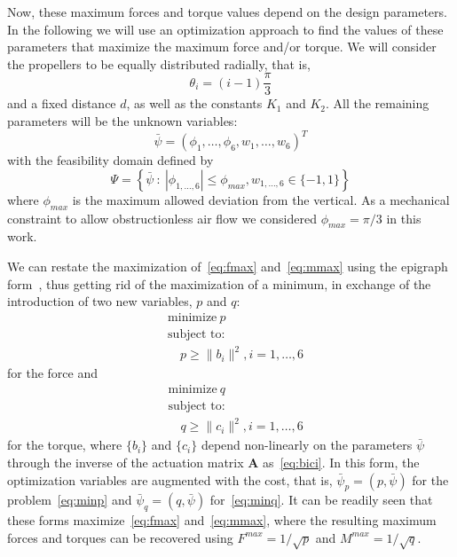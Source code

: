\documentclass[review]{elsarticle}
\begin{document}
Now, these maximum forces and torque values depend on the design
parameters. In the following we will use an optimization approach to
find the values of these parameters that maximize the maximum force
and/or torque. We will consider the propellers to be equally
distributed radially, that is,
\begin{equation}
  \label{eq:thetas}
  \theta_i = (i-1) \frac{\pi}{3}
\end{equation}
and a fixed distance $d$, as well as the constants $K_1$ and $K_2$. All the
remaining parameters will be the unknown variables:
\begin{equation}
  \bar{\psi} = ( \phi_1, \ldots, \phi_6, w_1,\ldots, w_6 )^T
\end{equation}
with the feasibility domain defined by
\begin{equation}
  \Psi = \left\{ \bar{\psi} \::\: |\phi_{1,\ldots,6}| \leq
  \phi_{max}, w_{1,\ldots,6}\in\{-1,1\} \right\}
\end{equation}
where $\phi_{max}$ is the maximum allowed deviation from the
vertical. As a mechanical constraint to allow obstructionless air flow
we considered $\phi_{max}=\pi/3$ in this work.

We can restate the maximization of~\eqref{eq:fmax}
and~\eqref{eq:mmax} using the epigraph form~\cite{boyd04}, thus getting rid of the
maximization of a minimum, in exchange of the introduction of two new
variables, $p$ and $q$:
\begin{equation}
  \label{eq:minp}
  \begin{split}
    &\text{minimize}\: p \\
    &\text{subject to:} \\
    &\quad p \geq \|b_i\|^2, i=1,\ldots,6
  \end{split}
\end{equation}
for the force and
\begin{equation}
  \label{eq:minq}
  \begin{split}
    &\text{minimize}\: q \\
    &\text{subject to:} \\
    &\quad q \geq \|c_i\|^2, i=1,\ldots,6
  \end{split}
\end{equation}
for the torque, where $\{b_i\}$ and $\{c_i\}$ depend non-linearly on
the parameters $\bar{\psi}$ through the inverse of the actuation
matrix $\mathbf{A}$ as~\eqref{eq:bici}. In this form, the optimization
variables are augmented with the cost, that is,
$\bar{\psi}_p=(p, \bar{\psi})$ for the problem~\eqref{eq:minp} and
$\bar{\psi}_q=(q, \bar{\psi})$ for~\eqref{eq:minq}.  It can be readily
seen that these forms maximize~\eqref{eq:fmax} and~\eqref{eq:mmax},
where the resulting maximum forces and torques can be recovered using
$F^{max}=1/\sqrt{p}$ and $M^{max}=1/\sqrt{q}$.
\end{document}
